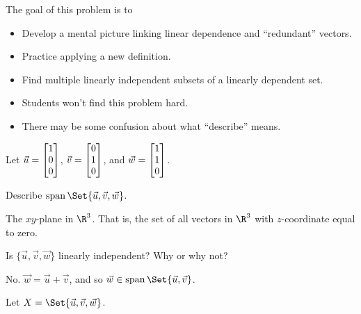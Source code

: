 \documentclass{problemset}
\newcommand{\bookonlynewpage}{\begin{bookonly}\newpage\end{bookonly}}
\begin{document}
	\bookonlynewpage

	\question
	\begin{annotation}
		\begin{goals}

			The goal of this problem is to
			\begin{itemize}
				\item Develop a mental picture linking linear dependence and
					``redundant'' vectors.
				\item Practice applying a new definition.
				\item Find multiple linearly independent subsets of a linearly dependent set.
			\end{itemize}
		\end{goals}

		\begin{notes}
			\begin{itemize}
				\item Students won't find this problem hard.
				\item There may be some confusion about what ``describe'' means.
			\end{itemize}
		\end{notes}
	\end{annotation}
		Let $\vec u=\mat{1\\0\\0}$, $\vec v=\mat{0\\1\\0}$, and $\vec w=\mat{1\\1\\0}$.
	\begin{parts}
		\item Describe $\Span\Set{\vec u,\vec v,\vec w}$.
			\begin{solution}
				The $xy$-plane in $\R^3$. That is, the set of all vectors in $\R^3$ with $z$-coordinate
				equal to zero.
			\end{solution}
		\item Is $\{\vec u,\vec v,\vec w\}$ linearly independent? Why or why not?
			\begin{solution}
				No. $\vec w=\vec u+\vec v$, and so $\vec w \in \Span\Set{\vec u, \vec v}$.
			\end{solution}
	\end{parts}

	Let $X=\Set{\vec u,\vec v,\vec w}$.
\end{document}
